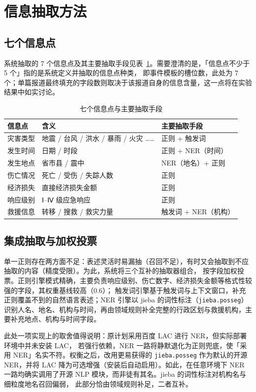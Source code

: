 \documentclass[11pt,a4paper]{ctexart}
\begin{document}
\section{信息抽取方法}

\subsection{七个信息点}

系统抽取的 7 个信息点及其主要抽取手段见表~\ref{tab:fields}。需要澄清的是，「信息点不少于 5 个」指的是系统定义并抽取的信息点种类，
即事件模板的槽位数，此处为 7 个；单篇报道最终填充的字段数则取决于该报道自身的信息含量，这一点将在实验结果中如实讨论。

\begin{table}[ht]
\centering
\caption{七个信息点与主要抽取手段}
\label{tab:fields}
\begin{tabular}{lll}
\toprule
信息点 & 含义 & 主要抽取手段 \\
\midrule
灾害类型 & 地震 / 台风 / 洪水 / 暴雨 / 火灾 …… & 正则 + 触发词 \\
发生时间 & 日期 / 时段 & 正则 + NER（时间） \\
发生地点 & 省市县 / 震中 & NER（地名）+ 正则 \\
伤亡情况 & 死亡 / 受伤 / 失踪人数 & 正则 \\
经济损失 & 直接经济损失金额 & 正则 \\
响应级别 & Ⅰ--Ⅳ 级应急响应 & 正则 \\
救援信息 & 转移 / 搜救 / 救灾力量 & 触发词 + NER（机构） \\
\bottomrule
\end{tabular}
\end{table}

\subsection{集成抽取与加权投票}

单一正则存在两方面不足：表述灵活时易漏抽（召回不足），有时又会抽取到不应抽取的内容（精度受限）。为此，系统将三个互补的抽取器组合，
按字段加权投票。正则引擎模式精确，主要负责响应级别、伤亡数字、经济损失金额等格式性较强的字段，其权重基线较高（0.6）；
触发词引擎基于触发词与上下文窗口，补充正则覆盖不到的自然语言表述；NER 引擎以 jieba 的词性标注（\texttt{jieba.posseg}）
识别人名、地名、机构与时间，再由领域规则补全完整的行政区划与救援机构，主要补充地点、机构与时间字段。

此处一项实现上的取舍值得说明：原计划采用百度 LAC 进行 NER，但实际部署环境中并未安装 LAC，
若强行依赖，NER 一路将静默退化为正则兜底，使「采用 NER」名实不符。权衡之后，改用更易获得的
\texttt{jieba.posseg} 作为默认的开源 NER，并将 LAC 降为可选增强（安装后自动启用）。如此，在任意环境下
NER 一路均确实调用了开源 NLP 模块，而非徒有其名。jieba 的词性标注对机构名与细粒度地名召回偏弱，
此部分恰由领域规则补足，二者互补。
\end{document}
